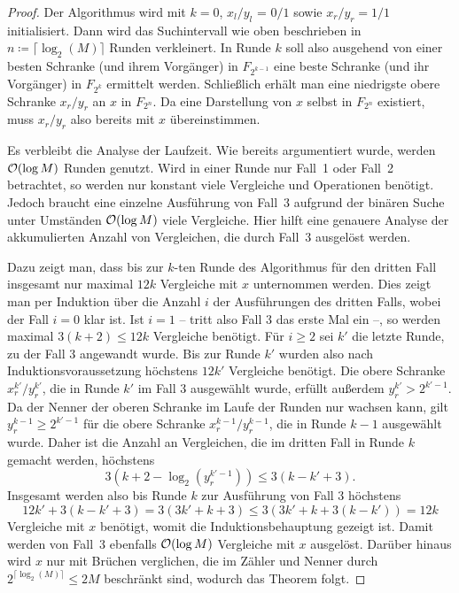 \begin{proof}
 	Der Algorithmus wird mit $k=0$, $x_l/y_l$ = $0/1$ sowie $x_r/y_r = 1/1$ initialisiert.
 	Dann wird das Suchintervall wie oben beschrieben in $n\coloneq \lceil \log_2(M) \rceil$ Runden verkleinert.
 	In Runde $k$ soll also ausgehend von einer besten Schranke (und ihrem Vorgänger) in $F_{2^{k-1}}$ eine beste Schranke (und ihr Vorgänger) in $F_{2^k}$ ermittelt werden.
 	Schließlich erhält man eine niedrigste obere Schranke $x_r/y_r$ an $x$ in $F_{2^n}$.
 	Da eine Darstellung von $x$ selbst in $F_{2^n}$ existiert, muss $x_r/y_r$ also bereits mit $x$ übereinstimmen.
 	
 	Es verbleibt die Analyse der Laufzeit.
 	Wie bereits argumentiert wurde, werden $\mathcal{O}(\log M)$ Runden genutzt.
 	Wird in einer Runde nur Fall~1 oder Fall~2 betrachtet, so werden nur konstant viele Vergleiche und Operationen benötigt.
 	Jedoch braucht eine einzelne Ausführung von Fall~3 aufgrund der binären Suche unter Umständen $\mathcal{O}(\log M)$ viele Vergleiche.
 	Hier hilft eine genauere Analyse der akkumulierten Anzahl von Vergleichen, die durch Fall~3 ausgelöst werden.
 	
 	Dazu zeigt man, dass bis zur $k$-ten Runde des Algorithmus für den dritten Fall insgesamt nur maximal $12k$ Vergleiche mit $x$ unternommen werden.
 	Dies zeigt man per Induktion über die Anzahl $i$ der Ausführungen des dritten Falls, wobei der Fall $i=0$ klar ist.
 	Ist $i=1$ -- tritt also Fall 3 das erste Mal ein --, so werden maximal $3(k+2) \leq 12k$ Vergleiche benötigt.
 	Für $i\geq2$ sei $k'$ die letzte Runde, zu der Fall 3 angewandt wurde.
 	Bis zur Runde $k'$ wurden also nach Induktionsvoraussetzung höchstens $12k'$ Vergleiche benötigt.
 	Die obere Schranke $x_r^{k'} / y_r^{k'}$, die in Runde $k'$ im Fall $3$ ausgewählt wurde, erfüllt außerdem $y_r^{k'} > 2^{k'-1}$.
 	Da der Nenner der oberen Schranke im Laufe der Runden nur wachsen kann, gilt $y_r^{k - 1} \geq 2^{k'-1}$ für die obere Schranke $x_r^{k-1}/y_r^{k-1}$, die in Runde $k-1$ ausgewählt wurde.
 	Daher ist die Anzahl an Vergleichen, die im dritten Fall in Runde $k$ gemacht werden, höchstens \[
 	3(k+2-\log_2(y_r^{k' - 1}))\leq 3(k - k' + 3).
 	\]
 	Insgesamt werden also bis Runde $k$ zur Ausführung von Fall 3 höchstens \[
 	12k' + 3(k-k'+3) = 3(3k' + k + 3) \leq 3(3k' + k + 3(k-k')) = 12 k
 	\]
 	Vergleiche mit $x$ benötigt, womit die Induktionsbehauptung gezeigt ist.
 	Damit werden von Fall~3 ebenfalls $\mathcal{O}(\log M)$ Vergleiche mit $x$ ausgelöst.
 	Darüber hinaus wird $x$ nur mit Brüchen verglichen, die im Zähler und Nenner durch $2^{\lceil \log_2(M) \rceil}\leq 2M$ beschränkt sind, wodurch das Theorem folgt.
 \end{proof}

